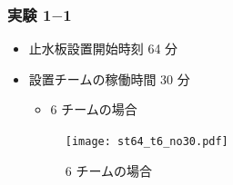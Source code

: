 \documentclass[a4paper,12pt,fleqn]{jarticle}
\begin{document}
\subsubsection{実験 1$-$1}
\begin{itemize}
\item 止水板設置開始時刻 64 分
\item 設置チームの稼働時間 30 分


\begin{itemize}
\item 6 チームの場合
\end{itemize}

\begin{figure}[H]
\begin{center}
  \texttt{[image: st64\_t6\_no30.pdf]}
  \caption{6 チームの場合}
  \label{fig:st64_t6_no30}
  \end{center}
\end{figure}






\end{itemize}
\end{document}
